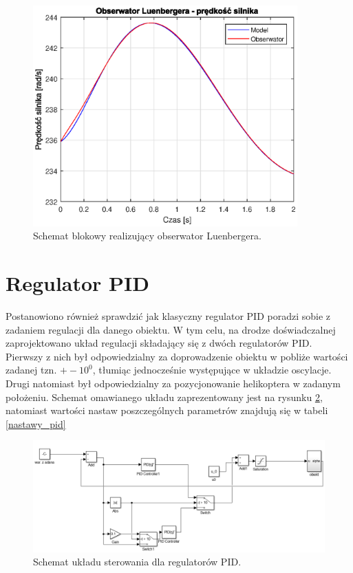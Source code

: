 \documentclass[11pt,a4paper]{article}
\begin{document}
\begin{figure}[ht]
	\centering
	\includegraphics[width=4in]{Figures/obsv_w_v.eps}
	\caption{Schemat blokowy realizujący obserwator Luenbergera.}
	\label{fig:obsv_w_v}
\end{figure}

\FloatBarrier
\newpage
\section{Regulator PID}
Postanowiono również sprawdzić jak klasyczny regulator PID poradzi sobie z zadaniem regulacji dla danego obiektu. W tym celu, na drodze doświadczalnej zaprojektowano układ regulacji składający się z dwóch regulatorów PID. Pierwszy z nich był odpowiedzialny za doprowadzenie obiektu w pobliże wartości zadanej tzn. $+- 10^0$, tłumiąc jednocześnie występujące w układzie oscylacje. Drugi natomiast był odpowiedzialny za pozycjonowanie helikoptera w zadanym położeniu. Schemat omawianego układu zaprezentowany jest na rysunku \ref{fig:pid_schemat}, natomiast wartości nastaw poszczególnych parametrów znajdują się w tabeli \ref{nastawy_pid} 

\begin{figure}[H]
	\centering
	\includegraphics[scale=0.45]{Figures/PID_schemat.png}
	\caption{Schemat układu sterowania dla regulatorów PID.}
	\label{fig:pid_schemat}
\end{figure}
\end{document}
